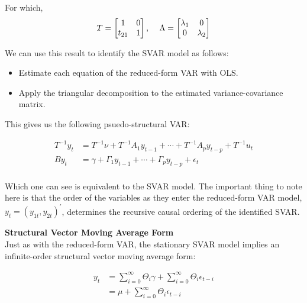\documentclass[11pt]{article}
\begin{document}
\vspace{3.5mm}
For which, 
\begin{equation*}
T = \begin{bmatrix} 1 & 0 \\ t_{21} & 1 \end{bmatrix} \mbox{, \quad} \Lambda = \begin{bmatrix} \lambda_{1} & 0 \\ 0 & \lambda_{2} \end{bmatrix}
\end{equation*}

\vspace{3.5mm}
We can use this result to identify the SVAR model as follows:

\begin{itemize}
 \item Estimate each equation of the reduced-form VAR with OLS.
 \item Apply the triangular decomposition to the estimated variance-covariance matrix.
\end{itemize}

\newpage
This gives us the following psuedo-structural VAR:

\begin{align*}
 T^{-1} y_{t} &= T^{-1} \nu + T^{-1} A_{1} y_{t-1} + \cdots + T^{-1} A_{p} y_{t-p} + T^{-1} u_{t} \\
 B y_{t} &= \gamma + \Gamma_{1} y_{t-1} + \cdots + \Gamma_{p} y_{t-p} + \epsilon_{t} \\
\end{align*}

Which one can see is equivalent to the SVAR model. The important thing to note here is that the order
of the variables as they enter the reduced-form VAR model, $y_{t} = (y_{1t},  y_{2t})^{\prime}$, determines
the recursive causal ordering of the identified SVAR.

\vspace{10mm}
\textbf{Structural Vector Moving Average Form} \\

\vspace{3.5mm}
Just as with the reduced-form VAR, the stationary SVAR model implies an infinite-order structural vector moving
average form:

\vspace{2mm}
\begin{align*}
y_{t} &= \sum\limits_{i=0}^{\infty} \Theta_{i} \gamma + \sum\limits_{i=0}^{\infty} \Theta_{i} \epsilon_{t-i} \\
      &= \mu + \sum\limits_{i=0}^{\infty} \Theta_{i} \epsilon_{t-i} \\
\end{align*}
\end{document}
